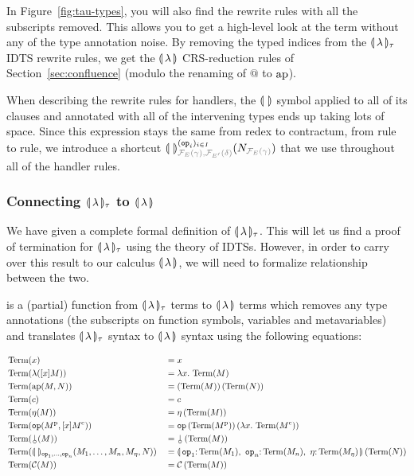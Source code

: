 In Figure~\ref{fig:tau-types}, you will also find the rewrite rules with
all the subscripts removed. This allows you to get a high-level look at the
term without any of the type annotation noise. By removing the typed
indices from the $\llparenthesis \, \lambda \, \rrparenthesis_\tau$ IDTS rewrite rules, we get the
$\llparenthesis \, \lambda \, \rrparenthesis$ CRS-reduction rules of Section~\ref{sec:confluence}
(modulo the renaming of $@$ to $\operatorname{ap}$).

When describing the rewrite rules for handlers, the $\llparenthesis \,  \, \rrparenthesis$ symbol
applied to all of its clauses and annotated with all of the intervening
types ends up taking lots of space. Since this expression stays the same
from redex to contractum, from rule to rule, we introduce a shortcut
$\banana{}^{(\op{op}_i)_{i \in
    I}}_{\typehint{\FF_E(\gamma),\FF_{E'}(\delta)}}(N_{\typehint{\FF_E(\gamma)}})$
that we use throughout all of the handler rules.

\subsubsection{Connecting $\llparenthesis \, \lambda \, \rrparenthesis_\tau$ to $\llparenthesis \, \lambda \, \rrparenthesis$}
\label{sssec:connecting-bananas}

We have given a complete formal definition of $\llparenthesis \, \lambda \, \rrparenthesis_\tau$. This
will let us find a proof of termination for $\llparenthesis \, \lambda \, \rrparenthesis_\tau$ using
the theory of IDTSs. However, in order to carry over this result to our
calculus $\llparenthesis \, \lambda \, \rrparenthesis$, we will need to formalize relationship between
the two.

\begin{definition}
   is a (partial) function from $\llparenthesis \, \lambda \, \rrparenthesis_\tau$ terms
  to $\llparenthesis \, \lambda \, \rrparenthesis$ terms which removes any type annotations (the
  subscripts on function symbols, variables and metavariables) and
  translates $\llparenthesis \, \lambda \, \rrparenthesis_\tau$ syntax to $\llparenthesis \, \lambda \, \rrparenthesis$ syntax
  using the following equations:
  
  \begin{align*}
    & \Term(x) &&= x \\
    & \Term(\lambda([x] M)) &&= \lam{x}{\Term(M)} \\
    & \Term(\aps(M, N)) &&= \ap{(\Term(M))}{(\Term(N))} \\
    & \Term(c) &&= c \\
    & \Term(\eta(M)) &&= \etaE{(\Term(M))} \\
    & \Term(\op{op}(M^{\mathrm{p}}, [x] M^{\mathrm{c}})) &&= \app{\op{op}}{(\Term(M^{\mathrm{p}}))}{(\lam{x}{\Term(M^{\mathrm{c}})})} \\
    & \Term(\cherry(M)) &&= \ap{\cherry}{(\Term(M))} \\
    & \Term(\banana{}_{\op{op}_1, \ldots, \op{op}_n}(M_1, \ldots, M_n, M_\eta, N)) &&= \ap{\banana{\onto{\op{op}_1}{\Term(M_1)},\ \onto{\op{op}_n}{\Term(M_n)},\ \onto{\eta}{\Term(M_\eta)}}}{(\Term(N))} \\
    & \Term(\CC(M)) &&= \ap{\CC}{(\Term(M))}
  \end{align*}
\end{definition}

